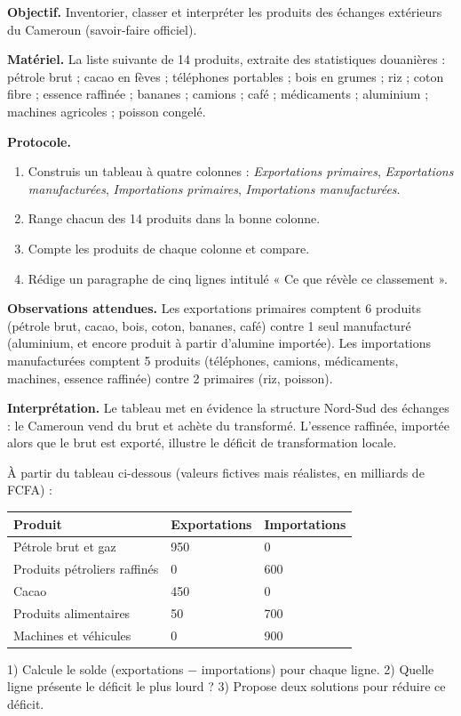 \documentclass[11pt]{article}
\begin{document}
\begin{experience}
\textbf{Objectif.} Inventorier, classer et interpréter les produits des échanges extérieurs du Cameroun (savoir-faire officiel).

\textbf{Matériel.} La liste suivante de 14 produits, extraite des statistiques douanières : pétrole brut ; cacao en fèves ; téléphones portables ; bois en grumes ; riz ; coton fibre ; essence raffinée ; bananes ; camions ; café ; médicaments ; aluminium ; machines agricoles ; poisson congelé.

\textbf{Protocole.}
\begin{enumerate}
\item Construis un tableau à quatre colonnes : \emph{Exportations primaires}, \emph{Exportations manufacturées}, \emph{Importations primaires}, \emph{Importations manufacturées}.
\item Range chacun des 14 produits dans la bonne colonne.
\item Compte les produits de chaque colonne et compare.
\item Rédige un paragraphe de cinq lignes intitulé « Ce que révèle ce classement ».
\end{enumerate}

\textbf{Observations attendues.} Les exportations primaires comptent 6 produits (pétrole brut, cacao, bois, coton, bananes, café) contre 1 seul manufacturé (aluminium, et encore produit à partir d'alumine importée). Les importations manufacturées comptent 5 produits (téléphones, camions, médicaments, machines, essence raffinée) contre 2 primaires (riz, poisson).

\textbf{Interprétation.} Le tableau met en évidence la structure Nord-Sud des échanges : le Cameroun vend du brut et achète du transformé. L'essence raffinée, importée alors que le brut est exporté, illustre le déficit de transformation locale.
\end{experience}

\begin{exercice}
À partir du tableau ci-dessous (valeurs fictives mais réalistes, en milliards de FCFA) :
\begin{center}
\begin{tabularx}{\linewidth}{|l|X|X|}\hline
\rowcolor{popblueL} \textbf{Produit} & \textbf{Exportations} & \textbf{Importations} \\ \hline
Pétrole brut et gaz & 950 & 0 \\ \hline
Produits pétroliers raffinés & 0 & 600 \\ \hline
Cacao & 450 & 0 \\ \hline
Produits alimentaires & 50 & 700 \\ \hline
Machines et véhicules & 0 & 900 \\ \hline
\end{tabularx}
\end{center}
1) Calcule le solde (exportations $-$ importations) pour chaque ligne. 2) Quelle ligne présente le déficit le plus lourd ? 3) Propose deux solutions pour réduire ce déficit.
\end{exercice}
\end{document}
